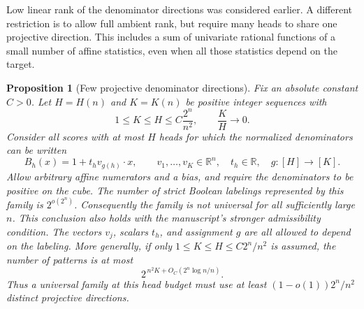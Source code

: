 \documentclass[11pt]{article}
\newtheorem{proposition}{Proposition}
\begin{document}
Low linear rank of the denominator directions was considered earlier.
A different restriction is to allow full ambient rank, but require
many heads to share one projective direction. This includes a sum of
univariate rational functions of a small number of affine statistics,
even when all those statistics depend on the target.

\begin{proposition}[Few projective denominator directions]
Fix an absolute constant $C>0$. Let $H=H(n)$ and $K=K(n)$ be positive
integer sequences with
\[
 1\leq K\leq H\leq C\frac{2^n}{n^2},\qquad \frac KH\longrightarrow0.
\]
Consider all scores with at most $H$ heads for which the normalized
denominators can be written
\[
 B_h(x)=1+t_h v_{g(h)}\cdot x,
 \qquad v_1,\ldots,v_K\in\mathbb R^n,
 \quad t_h\in\mathbb R,
 \quad g:[H]\longrightarrow[K].
\]
Allow arbitrary affine numerators and a bias, and require the
denominators to be positive on the cube. The number of strict Boolean
labelings represented by this family is $2^{o(2^n)}$. Consequently
the family is not universal for all sufficiently large $n$.
This conclusion also holds with the manuscript's stronger admissibility
condition. The vectors $v_j$, scalars $t_h$, and assignment $g$ are
all allowed to depend on the labeling.
More generally, if only $1\leq K\leq H\leq C2^n/n^2$ is assumed,
the number of patterns is at most
\[
 2^{\,n^2K+O_C(2^n\log n/n)}.
\]
Thus a universal family at this head budget must use at least
$(1-o(1))2^n/n^2$ distinct projective directions.
\end{proposition}
\end{document}
